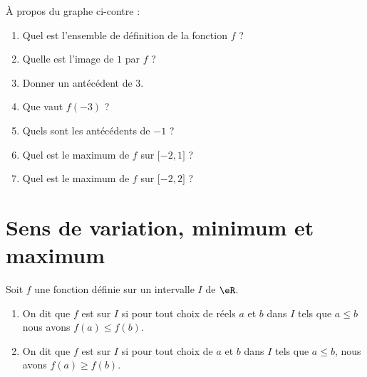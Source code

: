 \begin{multicols}{2}

À propos du graphe ci-contre :
\begin{enumerate}
    \item
        Quel est l'ensemble de définition de la fonction \( f\) ?
    \item
        Quelle est l'image de \( 1\) par \( f\) ?
    \item
        Donner un antécédent de \( 3\).
    \item
        Que vaut \( f(-3)\) ?
    \item
        Quels sont les antécédents de \( -1\) ?
    \item 
        Quel est le maximum de \( f\) sur \( \mathopen[ -2 , 1 \mathclose]\) ?
    \item
        Quel est le maximum de \( f\) sur \( \mathopen[ -2 , 2 \mathclose]\) ?
\end{enumerate}
    
    \columnbreak

\begin{center}
   
\end{center}

\end{multicols}

\section{Sens de variation, minimum et maximum}

\begin{definition}
      Soit $f$ une fonction définie sur un intervalle \( I\) de \( \eR\).
      \begin{enumerate}
          \item 
              On dit que $f$ est  sur $I$ si pour tout choix de réels $a$ et $b$ dans $I$ tels que $a\leq b$ nous avons $f(a)\leq f(b)$.
    \item 
        On dit que $f$ est  sur $I$ si pour tout choix de $a$ et $b$ dans $I$ tels que $a\leq b$, nous avons $f(a)\geq f(b)$. 
      \end{enumerate}
\end{definition}

